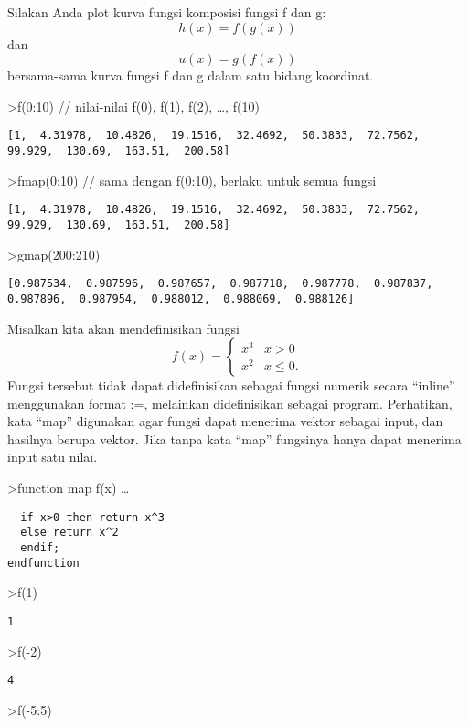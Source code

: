 \documentclass[
]{book}
\begin{document}
Silakan Anda plot kurva fungsi komposisi fungsi f dan g:\[h(x)=f(g(x))\]dan \[u(x)=g(f(x))\]bersama-sama kurva fungsi f dan g dalam satu bidang koordinat.

\textgreater f(0:10) // nilai-nilai f(0), f(1), f(2), \ldots, f(10)

\begin{verbatim}
[1,  4.31978,  10.4826,  19.1516,  32.4692,  50.3833,  72.7562,
99.929,  130.69,  163.51,  200.58]
\end{verbatim}

\textgreater fmap(0:10) // sama dengan f(0:10), berlaku untuk semua fungsi

\begin{verbatim}
[1,  4.31978,  10.4826,  19.1516,  32.4692,  50.3833,  72.7562,
99.929,  130.69,  163.51,  200.58]
\end{verbatim}

\textgreater gmap(200:210)

\begin{verbatim}
[0.987534,  0.987596,  0.987657,  0.987718,  0.987778,  0.987837,
0.987896,  0.987954,  0.988012,  0.988069,  0.988126]
\end{verbatim}

Misalkan kita akan mendefinisikan fungsi \[f(x) = \begin{cases} x^3 & x>0 \\ x^2 & x\le 0. \end{cases}\]Fungsi tersebut tidak dapat didefinisikan sebagai fungsi numerik secara ``inline'' menggunakan format :=, melainkan didefinisikan sebagai program. Perhatikan, kata ``map'' digunakan agar fungsi dapat menerima vektor sebagai input, dan hasilnya berupa vektor. Jika tanpa kata ``map'' fungsinya hanya dapat menerima input satu nilai.

\textgreater function map f(x) \ldots{}

\begin{verbatim}
  if x>0 then return x^3
  else return x^2
  endif;
endfunction
\end{verbatim}

\textgreater f(1)

\begin{verbatim}
1
\end{verbatim}

\textgreater f(-2)

\begin{verbatim}
4
\end{verbatim}

\textgreater f(-5:5)
\end{document}
